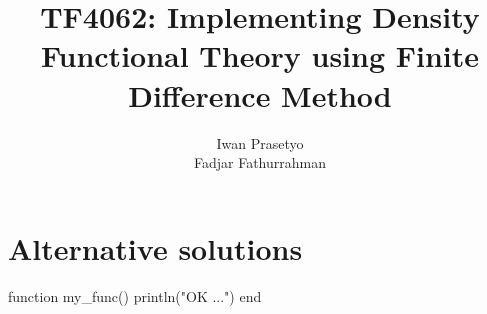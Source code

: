 \documentclass[a4paper]{article}
\begin{document}
\title{TF4062: Implementing Density Functional Theory using Finite Difference Method}
\author{Iwan Prasetyo \\
Fadjar Fathurrahman}
\date{}
\maketitle
















\appendix

\section{Alternative solutions}

\begin{juliacode}
function my_func()
    println("OK ...")
end
\end{juliacode}



\end{document}
